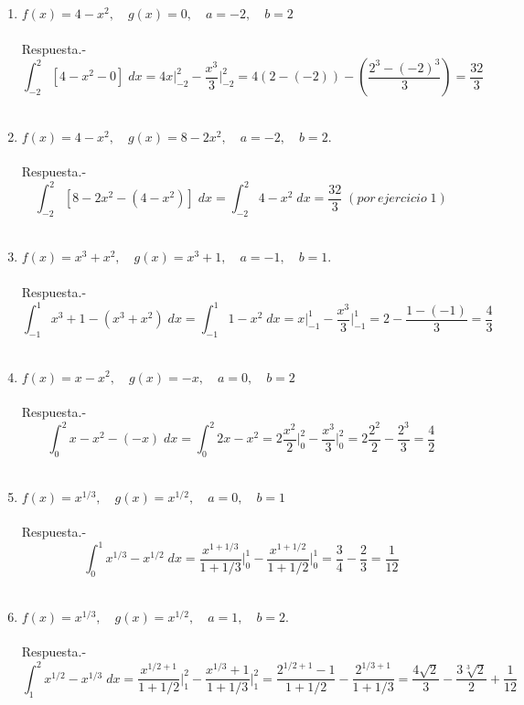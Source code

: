 \begin{enumerate}

\item $f(x) = 4 - x^2, \quad g(x)=0, \quad a = -2, \quad b = 2$\\\\
    Respuesta.-\; $$\int_{-2}^2 [4-x^2 - 0] \; dx = 4x \bigg|_{-2}^2 -\dfrac{x^3}{3}\bigg|_{-2}^2 = 4(2-(-2)) - \left(\dfrac{2^3 - (-2)^3}{3}\right)  = \dfrac{32}{3}$$\\ 

\item $f(x) = 4 - x^2, \quad g(x) = 8 - 2x^2,\quad a = -2, \quad b = 2.$\\\\
    Respuesta.-\; $$\int_{-2}^2 [8 - 2x^2 - (4 - x^2)] \; dx = \int_{-2}^2 4-x^2 \; dx = \dfrac{32}{3} \; (por \, ejercicio \; 1)$$\\

\item $f(x)=x^3+x^2,\quad g(x)=x^3 + 1, \quad a=-1, \quad b=1$.\\\\
    Respuesta.-\; $$\int_{-1}^1 x^3 + 1 - (x^3 + x^2) \;dx = \int_{-1}^1 1-x^2\; dx = x\bigg|_{-1}^1 - \dfrac{x^3}{3}\bigg|_{-1}^1   = 2 - \dfrac{1-(-1)}{3} = \dfrac{4}{3}$$\\

\item $f(x)=x-x^2,\quad g(x)=-x,\quad a=0,\quad b=2$\\\\
    Respuesta.-\; $$\int_0^2 x-x^2 - (-x) \; dx = \int_0^2 2x - x^2 = 2\dfrac{x^2}{2}\bigg|_0^2 - \dfrac{x^3}{3}\bigg|_0^2 = 2\dfrac{2^2}{2} - \dfrac{2^3}{3} = \dfrac{4}{2}$$\\

\item $f(x) = x^{1/3}, \quad g(x) = x^{1/2}, \quad a=0, \quad b=1$\\\\ 
    Respuesta.-\; $$\int_0^1 x^{1/3} - x^{1/2} \; dx = \dfrac{x^{1+1/3}}{1+1/3}\bigg|_0^1 - \dfrac{x^{1+1/2}}{1+1/2}\bigg|_0^1 = \dfrac{3}{4} - \dfrac{2}{3} = \dfrac{1}{12}$$\\

\item $f(x) = x^{1/3}, \quad g(x) = x^{1/2},\quad a=1,\quad b=2.$\\\\
    Respuesta.-\; $$\int_1^2 x^{1/2}-x^{1/3}\; dx = \dfrac{x^{1/2 + 1}}{1 + 1/2}\bigg|_1^2 - \dfrac{x^{1/3}+1}{1+1/3}\bigg|_1^2 = \dfrac{2^{1/2+1}-1}{1+1/2}-\dfrac{2^{1/3+1}}{1+1/3} = \dfrac{4\sqrt{2}}{3}-\dfrac{3\sqrt[3]{2}}{2}+\dfrac{1}{12}$$\\


\end{enumerate}
